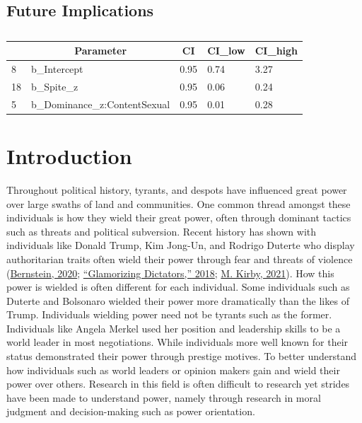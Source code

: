 \documentclass[
  donotrepeattitle,doc, 12pt, a4paper,floatsintext]{apa7}
\begin{document}
\hypertarget{future-implications}{%
\subsection{Future Implications}\label{future-implications}}

\newpage

\begin{table}[tbp]

\begin{center}
\begin{threeparttable}

\caption{\label{tab:unnamed-chunk-10}}

\begin{tabular}{lllll}
\toprule
 & \multicolumn{1}{c}{Parameter} & \multicolumn{1}{c}{CI} & \multicolumn{1}{c}{CI\_low} & \multicolumn{1}{c}{CI\_high}\\
\midrule
8 & b\_Intercept & 0.95 & 0.74 & 3.27\\
18 & b\_Spite\_z & 0.95 & 0.06 & 0.24\\
5 & b\_Dominance\_z:ContentSexual & 0.95 & 0.01 & 0.28\\
\bottomrule
\end{tabular}

\end{threeparttable}
\end{center}

\end{table}

\hypertarget{introduction}{%
\section{Introduction}\label{introduction}}

Throughout political history, tyrants, and despots have influenced great power over large swaths of land and communities. One common thread amongst these individuals is how they wield their great power, often through dominant tactics such as threats and political subversion. Recent history has shown with individuals like Donald Trump, Kim Jong-Un, and Rodrigo Duterte who display authoritarian traits often wield their power through fear and threats of violence (\protect\hyperlink{ref-bernstein2020}{Bernstein, 2020}; \protect\hyperlink{ref-2018}{{``Glamorizing Dictators,''} 2018}; \protect\hyperlink{ref-kirby2021}{M. Kirby, 2021}). How this power is wielded is often different for each individual. Some individuals such as Duterte and Bolsonaro wielded their power more dramatically than the likes of Trump. Individuals wielding power need not be tyrants such as the former. Individuals like Angela Merkel used her position and leadership skills to be a world leader in most negotiations. While individuals more well known for their status demonstrated their power through prestige motives. To better understand how individuals such as world leaders or opinion makers gain and wield their power over others. Research in this field is often difficult to research yet strides have been made to understand power, namely through research in moral judgment and decision-making such as power orientation.
\end{document}
